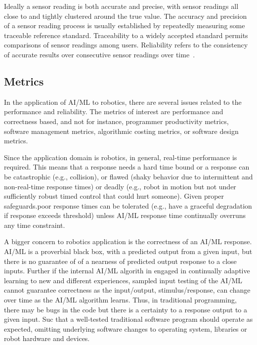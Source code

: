  
 
Ideally a sensor reading is both accurate and precise, with sensor readings all close to and tightly clustered around the true value. The accuracy and precision of a sensor reading process is usually established by repeatedly measuring some traceable reference standard. Traceability to a widely accepted standard permits comparisons of sensor readings among users. Reliability refers to the consistency of accurate results over consecutive sensor readings over time~\cite{typereliability}.



\subsection{Metrics}

In the application of AI/ML to robotics, there are several issues related to the performance and reliability.  The metrics of interest are performance and correctness based, and not for instance, programmer productivity metrics, software management metrics, algorithmic costing metrics, or software design metrics. 

Since the application domain is robotics, in general, real-time performance is required. This means that a response needs a hard time bound or a response can be catastrophic (e.g., collision), or flawed (shaky behavior due to intermittent and non-real-time response times) or deadly (e.g., robot in motion but not under sufficiently robust timed control that could hurt someone). Given proper safeguards.poor response times can be tolerated (e.g., have a graceful degradation if response exceeds threshold)  unless AI/ML response time continually overruns any time constraint.

A bigger concern to robotics application is the correctness of an AI/ML response. AI/ML is a proverbial black box, with a predicted  output from a given input, but there is no guarantee of of a nearness of predicted output response to a close inputs. Further if the internal AI/ML algorith in engaged in continually adaptive learning to new and different experiences, sampled input testing of the AI/ML cannot guarantee correctness as the input/output, stimulus/response, can change over time as the AI/ML algorithm learns. Thus, in traditional programming, there may be bugs in the code but there is a certainty to a response output to a given input. Suc that a well-tested traditional software program should operate as expected, omitting underlying software changes to operating system, libraries or robot hardware and devices. 

